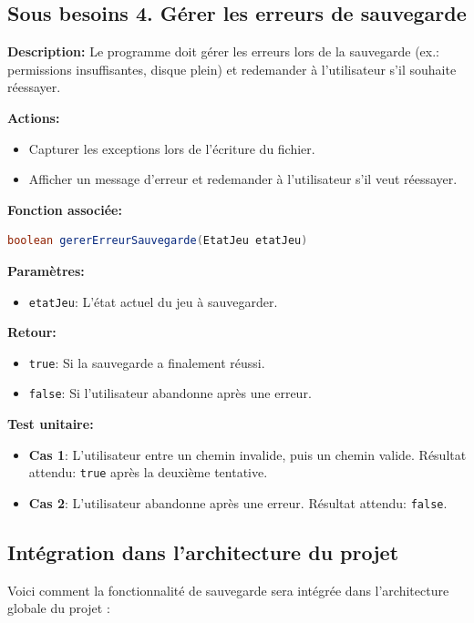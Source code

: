 \documentclass[a4paper]{article}
\begin{document}
\subsection*{Sous besoins 4. Gérer les erreurs de sauvegarde}
\begin{besoinbox}
\textbf{Description:}
Le programme doit gérer les erreurs lors de la sauvegarde (ex.: permissions insuffisantes, disque plein) et redemander à l’utilisateur s’il souhaite réessayer.

\textbf{Actions:}
\begin{itemize}[leftmargin=2cm]
    \item Capturer les exceptions lors de l’écriture du fichier.
    \item Afficher un message d’erreur et redemander à l’utilisateur s’il veut réessayer.
\end{itemize}

\textbf{Fonction associée:}
\begin{lstlisting}[language=Java]
boolean gererErreurSauvegarde(EtatJeu etatJeu)
\end{lstlisting}

\textbf{Paramètres:}
\begin{itemize}[leftmargin=2cm]
    \item \texttt{etatJeu}: L'état actuel du jeu à sauvegarder.
\end{itemize}

\textbf{Retour:}
\begin{itemize}[leftmargin=2cm]
    \item \texttt{true}: Si la sauvegarde a finalement réussi.
    \item \texttt{false}: Si l'utilisateur abandonne après une erreur.
\end{itemize}

\textbf{Test unitaire:}
\begin{itemize}[leftmargin=2cm]
    \item \textbf{Cas 1}: L'utilisateur entre un chemin invalide, puis un chemin valide. Résultat attendu: \texttt{true} après la deuxième tentative.
    \item \textbf{Cas 2}: L'utilisateur abandonne après une erreur. Résultat attendu: \texttt{false}.
\end{itemize}
\end{besoinbox}

\subsection{Intégration dans l'architecture du projet}
\hangindent=0.8mm
Voici comment la fonctionnalité de sauvegarde sera intégrée dans l'architecture globale du projet :
\end{document}
